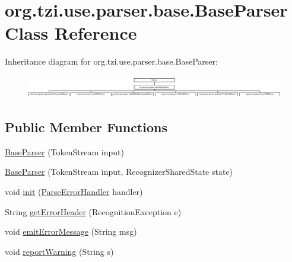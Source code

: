 \hypertarget{classorg_1_1tzi_1_1use_1_1parser_1_1base_1_1_base_parser}{\section{org.\-tzi.\-use.\-parser.\-base.\-Base\-Parser Class Reference}
\label{classorg_1_1tzi_1_1use_1_1parser_1_1base_1_1_base_parser}
}
Inheritance diagram for org.\-tzi.\-use.\-parser.\-base.\-Base\-Parser\-:\begin{figure}[H]
\begin{center}
\leavevmode
\includegraphics[height=1.007194cm]{classorg_1_1tzi_1_1use_1_1parser_1_1base_1_1_base_parser}
\end{center}
\end{figure}
\subsection*{Public Member Functions}
\begin{DoxyCompactItemize}
\item 
\hyperlink{classorg_1_1tzi_1_1use_1_1parser_1_1base_1_1_base_parser_a9ff9df6d28c88b79ed6549379567eef8}{Base\-Parser} (Token\-Stream input)
\item 
\hyperlink{classorg_1_1tzi_1_1use_1_1parser_1_1base_1_1_base_parser_a2efcfb927893b37582c7e91f92e01e1b}{Base\-Parser} (Token\-Stream input, Recognizer\-Shared\-State state)
\item 
void \hyperlink{classorg_1_1tzi_1_1use_1_1parser_1_1base_1_1_base_parser_add954a3b6169b62e819ade700705fce7}{init} (\hyperlink{classorg_1_1tzi_1_1use_1_1parser_1_1_parse_error_handler}{Parse\-Error\-Handler} handler)
\item 
String \hyperlink{classorg_1_1tzi_1_1use_1_1parser_1_1base_1_1_base_parser_a773bb6e7ebad0b3b1c06413682aa6661}{get\-Error\-Header} (Recognition\-Exception e)
\item 
void \hyperlink{classorg_1_1tzi_1_1use_1_1parser_1_1base_1_1_base_parser_ad0d718ddff5d42b412cfdc2fb648e74a}{emit\-Error\-Message} (String msg)
\item 
void \hyperlink{classorg_1_1tzi_1_1use_1_1parser_1_1base_1_1_base_parser_a7991ad9715af37c8250b76086feae4d8}{report\-Warning} (String s)
\end{DoxyCompactItemize}


